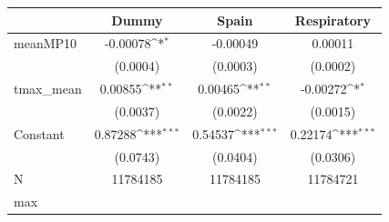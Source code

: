{
\def\sym#1{\ifmmode^{#1}\else\(^{#1}\)\fi}
\begin{tabular}{l*{3}{c}}
\toprule
            &\multicolumn{1}{c}{Dummy}&\multicolumn{1}{c}{Spain}&\multicolumn{1}{c}{Respiratory}\\
\midrule
meanMP10    &    -0.00078\sym{*}  &    -0.00049         &     0.00011         \\
            &    (0.0004)         &    (0.0003)         &    (0.0002)         \\
tmax\_mean   &     0.00855\sym{**} &     0.00465\sym{**} &    -0.00272\sym{*}  \\
            &    (0.0037)         &    (0.0022)         &    (0.0015)         \\
Constant    &     0.87288\sym{***}&     0.54537\sym{***}&     0.22174\sym{***}\\
            &    (0.0743)         &    (0.0404)         &    (0.0306)         \\
\midrule
N           &    11784185         &    11784185         &    11784721         \\
max         &                     &                     &                     \\
\bottomrule
\end{tabular}
}
